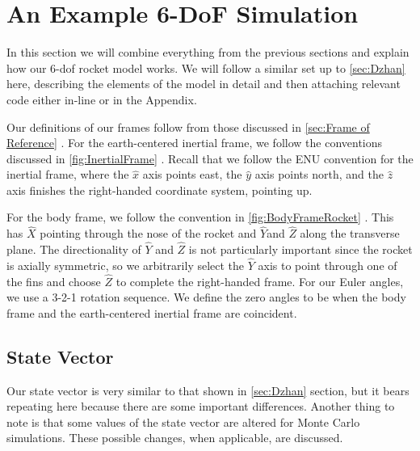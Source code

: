 \documentclass[10pt, openany, titlepage]{book}
\theoremstyle{definition}
\let\oldautoref\autoref
\renewcommand{\autoref}[1]{%
  \begingroup
  \hypersetup{linkcolor=black}%
  \oldautoref{#1}%
  \endgroup
}
\begin{document}
\chapter{An Example 6-DoF Simulation}\label{sec:6DoF}
In this section we will combine everything from the previous sections and explain how our 6-\gls{dof} rocket model works. We will follow a similar set up to \autoref{sec:Dzhan}  here, describing the elements of the model in detail and then attaching relevant code either in-line or in the Appendix.

Our definitions of our frames follow from those discussed in \autoref{sec:Frame of Reference}. For the earth-centered \gls{inertial frame}, we follow the conventions discussed in \autoref{fig:InertialFrame}. Recall that we follow the ENU convention for the inertial frame, where the $\hat{x}$ axis points east, the $\hat{y}$ axis points north, and the $\hat{z}$ axis finishes the right-handed coordinate system, pointing up.

For the \gls{body frame}, we follow the convention in \autoref{fig:BodyFrameRocket}. This has $\hat{X}$ pointing through the nose of the rocket and $\hat{Y}$and $\hat{Z}$ along the transverse plane. The directionality of $\hat{Y}$ and $\hat{Z}$ is not particularly important since the rocket is axially symmetric, so we arbitrarily select the $\hat{Y}$ axis to point through one of the fins and choose $\hat{Z}$ to complete the right-handed frame. For our \gls{Euler angles}, we use a 3-2-1 rotation sequence. We define the zero angles to be when the \gls{body frame} and the earth-centered \gls{inertial frame} are coincident.

\section{State Vector}
Our \gls{state vector} is very similar to that shown in \autoref{sec:Dzhan} section, but it bears repeating here because there are some important differences. Another thing to note is that some values of the \gls{state vector} are altered for Monte Carlo simulations. These possible changes, when applicable, are discussed.
\end{document}
